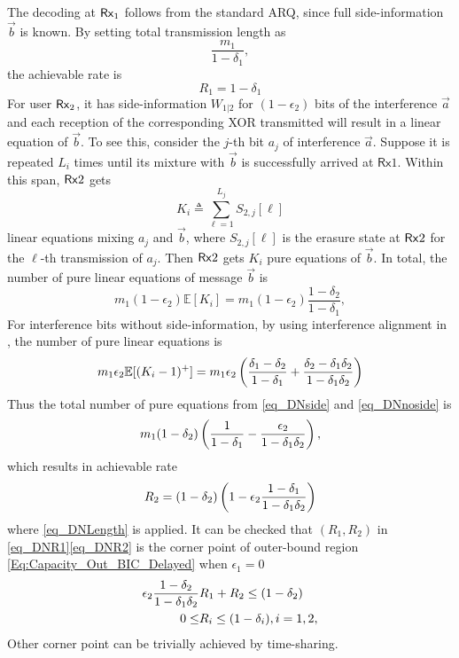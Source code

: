 The decoding at $\mathsf{Rx}_1$ follows from the standard ARQ, since full side-information
$\vec{b}$ is known. By
setting total transmission length as
\begin{equation} \label{eq_DNLength}
\frac{m_1}{1-\delta_1},
\end{equation}
the achievable rate is
\begin{equation} \label{eq_DNR1}
R_1=1-\delta_1
\end{equation}
For user $\mathsf{Rx}_2$, it has side-information $W_{1|2}$ for $(1-\epsilon_2)$ bits of the interference $\vec{a}$ and each reception of the corresponding XOR transmitted will result in a linear equation of $\vec{b}$. To see this, consider the $j$-th bit $a_j$ of interference $\vec{a}$. Suppose it is repeated $L_i$ times until its mixture with $\vec{b}$ is successfully arrived at $\mathsf{Rx}1$. Within this span, $\mathsf{Rx}2$ gets
\begin{equation} \label{eq_withSIclean}
K_i \triangleq \sum_{\ell=1}^{L_j}S_{2,j}[ \ell]
\end{equation}
linear equations mixing $a_j$ and $\vec{b}$, where $S_{2,j}[\ell]$ is the erasure state at $\mathsf{Rx}2$ for the $\ell$-th transmission of $a_j$. Then $\mathsf{Rx}2$ gets $K_i$ pure equations of $\vec{b}$. In total, the number of pure linear equations of message $\vec{b}$ is
\begin{equation} \label{eq_DNside}
m_1(1-\epsilon_2) \mathbb{E}[K_i]= m_1(1-\epsilon_2) \frac{1-\delta_2}{1-\delta_1},
\end{equation}
For interference bits without side-information, by using interference alignment in \cite{lin2019no}, the number of pure linear equations is
\begin{equation}
\label{eq_DNnoside}
m_1\epsilon_2 \mathbb{E}[(K_i-1)^+]=m_1 \epsilon_2 \left( \frac{\delta_1-\delta_2}{1-\delta_1}+\frac{\delta_2-\delta_1\delta_2}{1-\delta_1\delta_2} \right)
\end{equation}
Thus the total number of pure equations from \eqref{eq_DNside} and \eqref{eq_DNnoside} is
\[
m_1(1-\delta_2)\left( \frac{1}{1-\delta_1}-\frac{\epsilon_2}{1-\delta_1\delta_2} \right),
\]
which results in achievable rate
\begin{equation} \label{eq_DNR2}
R_2=(1-\delta_2)\left( 1-\epsilon_2 \frac{1-\delta_1}{1-\delta_1\delta_2} \right)
\end{equation}
where \eqref{eq_DNLength} is applied. It can be checked that $(R_1,R_2)$ in \eqref{eq_DNR1}\eqref{eq_DNR2} is the corner point of outer-bound region \eqref{Eq:Capacity_Out_BIC_Delayed} when $\epsilon_1=0$
\begin{align}
 \epsilon_2 \frac{1-\delta_2}{1-\delta_1\delta_2} & R_1 + R_2 \leq \left( 1 - \delta_2 \right) \\
 0 \leq & R_i \leq (1-\delta_i),   i = 1,2,
\end{align}
Other corner point can be trivially achieved by time-sharing.

